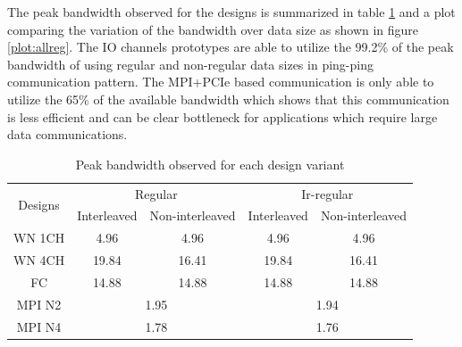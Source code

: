 The peak bandwidth observed for the designs is summarized in table \ref{tab:obs_peakbw} and a plot comparing the variation
of the bandwidth over data size as shown in figure \ref{plot:allreg}. The IO channels prototypes are able
to utilize the 99.2\% of the peak bandwidth of using regular and non-regular data sizes in ping-ping
communication pattern. The MPI+PCIe based communication is only able to utilize the 65\% of the available
bandwidth which shows that this communication is less efficient and can be clear bottleneck for applications
which require large data communications.
\begin{table}[ht]
    \centering
    \begin{tabular}{ccccc}
    \multicolumn{1}{c}{\multirow{2}{*}{Designs}} & \multicolumn{2}{c}{Regular} & \multicolumn{2}{c}{Ir-regular} \\ \cline{2-5}
    \multicolumn{1}{c}{} & Interleaved & \multicolumn{1}{c}{Non-interleaved} & Interleaved & \multicolumn{1}{c}{Non-interleaved} \\ \hline
    WN 1CH & \multicolumn{1}{c}{4.96} & 4.96 & \multicolumn{1}{c}{4.96} & 4.96 \\ \hline
    WN 4CH & \multicolumn{1}{c}{19.84} & 16.41 & \multicolumn{1}{c}{19.84} & 16.41 \\ \hline
    FC & \multicolumn{1}{c}{14.88} & 14.88 & \multicolumn{1}{c}{14.88} & 14.88 \\ \hline
    MPI N2 & \multicolumn{2}{c}{1.95} & \multicolumn{2}{c}{1.94} \\ \hline
    MPI N4 & \multicolumn{2}{c}{1.78} & \multicolumn{2}{c}{1.76} \\ \hline
    \end{tabular}%
    \caption{Peak bandwidth observed for each design variant}
    \label{tab:obs_peakbw}
\end{table}



